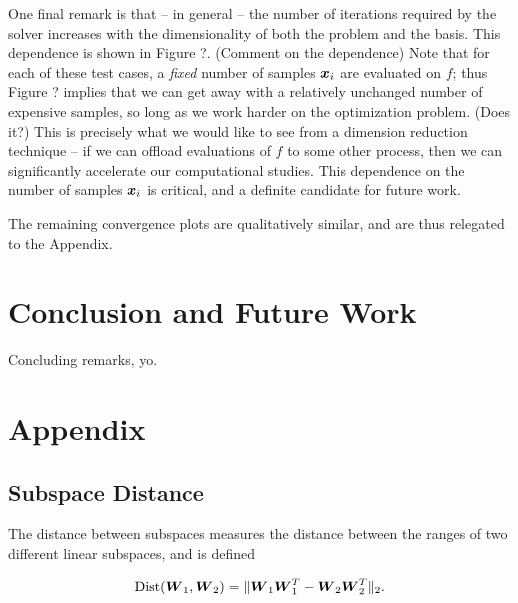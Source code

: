 \documentclass[]{aiaa-tc}%
\begin{document}
One final remark is that -- in general -- the number of iterations required by the solver increases with the dimensionality of both the problem and the basis. This dependence is shown in Figure ?. (Comment on the dependence) Note that for each of these test cases, a \emph{fixed} number of samples $\boldsymbol{x}_i$ are evaluated on $f$; thus Figure ? implies that we can get away with a relatively unchanged number of expensive samples, so long as we work harder on the optimization problem. (Does it?) This is precisely what we would like to see from a dimension reduction technique -- if we can offload evaluations of $f$ to some other process, then we can significantly accelerate our computational studies. This dependence on the number of samples $\boldsymbol{x}_i$ is critical, and a definite candidate for future work.


The remaining convergence plots are qualitatively similar, and are thus relegated to the Appendix.

\section{Conclusion and Future Work} \label{sec:conclusion}

Concluding remarks, yo.





\section{Appendix} \label{sec:appendix}
\subsection{Subspace Distance}
The distance between subspaces measures the distance between the ranges of two different linear subspaces, and is defined\cite{constantine2015}

\begin{equation}
\label{eq:subspace_distance}
\text{Dist}(\boldsymbol{W}_1,\boldsymbol{W}_2) = \|\boldsymbol{W}_1\boldsymbol{W}_1^T - \boldsymbol{W}_2\boldsymbol{W}_2^T\|_2.
\end{equation}
\end{document}
